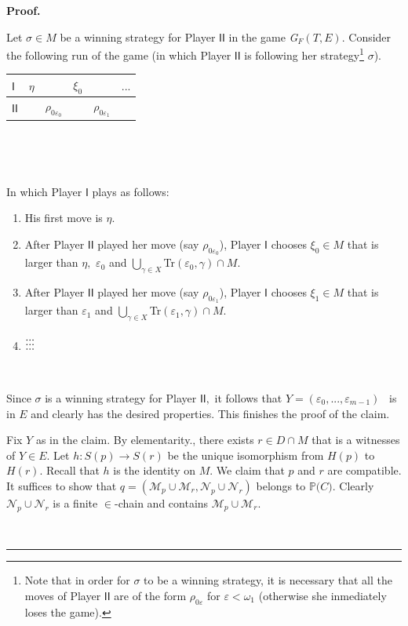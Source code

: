 \documentclass{article}
\newenvironment{proof}[1][Proof]{\noindent\textbf{#1.} }{\ \rule{0.5em}{0.5em}}
\begin{document}
\begin{proof}
\qquad\ \ \ \ \ 

Let $\sigma\in M$ be a winning strategy for Player $\mathsf{II}$ in the game
\emph{G}$_{F}\left(  T,E\right)  .$ Consider the following run of the game (in
which Player $\mathsf{II}$ is following her strategy\footnote{Note that in
order for $\sigma$ to be a winning strategy, it is necessary that all the
moves of Player $\mathsf{II}$ are of the form $\rho_{0\varepsilon}$ for
$\varepsilon<\omega_{1}$ (otherwise she inmediately loses the game).} $\sigma
$).\newline

\hfill%
\begin{tabular}
[c]{|l|l|l|l|l|l|}\hline
$\mathsf{I}$ & $\eta$ &  & $\xi_{0}$ &  & $...$\\\hline
$\mathsf{II}$ &  & $\rho_{0\varepsilon_{0}}$ &  & $\rho_{0\varepsilon_{1}}$ &
\\\hline
\end{tabular}
\hfill\ 

\qquad\ \qquad\ \ 

In which Player $\mathsf{I}$ plays as follows:

\begin{enumerate}
\item His first move is $\eta.$

\item After Player $\mathsf{II}$ played her move (say $\rho_{0\varepsilon_{0}%
}$), Player $\mathsf{I}$ chooses $\xi_{0}\in M$ that is larger than $\eta,$
$\varepsilon_{0}$ and $\bigcup\limits_{\gamma\in X}$\textsf{Tr}$(\varepsilon
_{0},\gamma)\cap M.$

\item After Player $\mathsf{II}$ played her move (say $\rho_{0\varepsilon_{1}%
}$), Player $\mathsf{I}$ chooses $\xi_{1}\in M$ that is larger than
$\varepsilon_{1}$ and $\bigcup\limits_{\gamma\in X}$\textsf{Tr}$(\varepsilon
_{1},\gamma)\cap M.$

\item[$\vdots$] $\vdots\hfill\vdots\hfill\vdots$
\end{enumerate}

\qquad\ \ \qquad

Since $\sigma$ is a winning strategy for Player $\mathsf{II,}$ it follows that
$Y=\left(  \varepsilon_{0},...,\varepsilon_{m-1}\right)  $ \ is in $E$ and
clearly has the desired properties. This finishes the proof of the claim.

\qquad\qquad\qquad

Fix $Y$ as in the claim. By elementarity., there exists $r\in D\cap M$ that is
a witnesses of $Y\in E.$ Let $h:S\left(  p\right)  \longrightarrow S\left(
r\right)  $ be the unique isomorphism from $H\left(  p\right)  $ to $H\left(
r\right)  .$ Recall that $h$ is the identity on $M.$ We claim that $p$ and $r$
are compatible. It suffices to show that $q=(\mathcal{M}_{p}\cup
\mathcal{M}_{r},\mathcal{N}_{p}\cup\mathcal{N}_{r})$ belongs to $\mathbb{P(}%
C\mathbb{)}.$ Clearly $\mathcal{N}_{p}\cup\mathcal{N}_{r}$ is a finite $\in
$-chain and contains $\mathcal{M}_{p}\cup\mathcal{M}_{r}.$


\end{proof}
\end{document}
